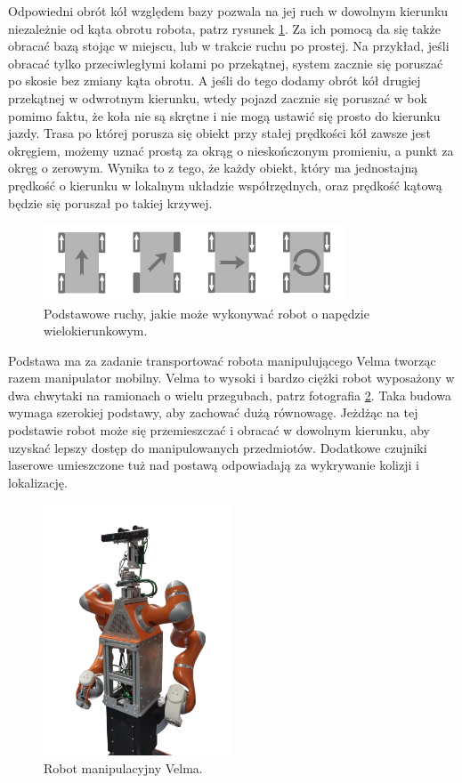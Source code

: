 	Odpowiedni obrót kół względem bazy pozwala na jej ruch w dowolnym kierunku niezależnie od kąta obrotu robota, patrz rysunek \ref{fig:mecanum_dirs}.
	Za ich pomocą da się także obracać bazą stojąc w miejscu, lub w trakcie ruchu po prostej.
	Na przykład, jeśli obracać tylko przeciwległymi kołami po przekątnej, system zacznie się poruszać po skosie bez zmiany kąta obrotu.
	A jeśli do tego dodamy obrót kół drugiej przekątnej w odwrotnym kierunku, wtedy pojazd zacznie się poruszać w bok pomimo faktu, że koła nie są skrętne i nie mogą ustawić się prosto do kierunku jazdy.
	Trasa po której porusza się obiekt przy stałej prędkości kół zawsze jest okręgiem, możemy uznać prostą za okrąg o nieskończonym promieniu, a punkt za okręg o zerowym.
	Wynika to z tego, że każdy obiekt, który ma jednostajną prędkość o kierunku w lokalnym układzie współrzędnych, oraz prędkość kątową będzie się poruszał po takiej krzywej.

	\begin{figure}[H]
	\centering
	\includegraphics[width=0.8\textwidth]{graphics/mecanum_dirs.pdf}
	\caption{Podstawowe ruchy, jakie może wykonywać robot o napędzie wielokierunkowym.}
	\label{fig:mecanum_dirs}
	\end{figure} 

	Podstawa ma za zadanie transportować robota manipulującego Velma tworząc razem manipulator mobilny.
	Velma to wysoki i bardzo ciężki robot wyposażony w dwa chwytaki na ramionach o wielu przegubach, patrz fotografia \ref{fig:velma}.
	Taka budowa wymaga szerokiej podstawy, aby zachować dużą równowagę.
	Jeżdżąc na tej podstawie robot może się przemieszczać i obracać w dowolnym kierunku, aby uzyskać lepszy dostęp do manipulowanych przedmiotów.
	Dodatkowe czujniki laserowe umieszczone tuż nad postawą odpowiadają za wykrywanie kolizji i lokalizację.

	\begin{figure}[H]
	\centering
	\includegraphics[width=0.5\textwidth]{graphics/velma.png}
	\caption{Robot manipulacyjny Velma.}
	\label{fig:velma}
	\end{figure} 

